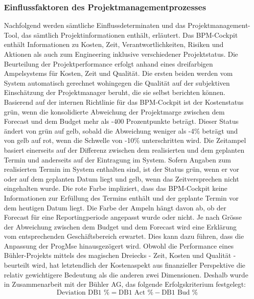 \subsubsection{Einflussfaktoren des Projektmanagementprozesses}\label{zweizwei}
Nachfolgend werden sämtliche Einflussdeterminaten und das Projektmanagement-Tool, das sämtlich Projektinformationen enthält, erläutert.
\newline
Das BPM-Cockpit enthält Informationen zu Kosten, Zeit, Verantwortlichkeiten, Risiken und Aktionen als auch zum Engineering inklusive verschiedener Projektstatus. Die Beurteilung der Projektperformance erfolgt anhand eines dreifarbigen Ampelsystems für Kosten, Zeit und Qualität. Die ersten beiden werden vom System automatisch gerechnet wohingegen die Qualität auf der subjektiven Einschätzung der Projektmanager beruht, die sie selbst berichten können. Basierend auf der internen Richtlinie für das BPM-Cockpit ist der Kostenstatus grün, wenn die konsolidierte Abweichung der Projektmarge zwischen dem Forecast und dem Budget mehr als -400 Prozentpunkte beträgt. Dieser Status ändert von grün auf gelb, sobald die Abweichung weniger als -4\% beträgt und von gelb auf rot, wenn die Schwelle von -10\% unterschritten wird. Die Zeitampel basiert einerseits auf der Differenz zwischen dem realisierten und dem geplanten Termin und anderseits auf der Eintragung im System. Sofern Angaben zum realisierten Termin im System enthalten sind, ist der Status grün, wenn er vor oder auf dem geplanten Datum liegt und gelb, wenn das Zeitversprechen nicht eingehalten wurde. Die rote Farbe impliziert, dass das BPM-Cockpit keine Informationen zur Erfüllung des Termins enthält und der geplante Termin vor dem heutigen Datum liegt. Die Farbe der Ampeln hängt davon ab, ob der Forecast für eine Reportingperiode angepasst wurde oder nicht. Je nach Grösse der Abweichung zwischen dem Budget und dem Forecast wird eine Erklärung vom entsprechenden Geschäftsbereich erwartet. Dies kann dazu führen, dass die Anpassung der ProgMse hinausgezögert wird.
\newline
Obwohl die Performance eines Bühler-Projekts mittels des magischen Dreiecks - Zeit, Kosten und Qualität - beurteilt wird, hat letztendlich der Kostenaspekt aus finanzieller Perspektive die relativ gewichtigere Bedeutung als die anderen zwei Dimensionen. Deshalb wurde in Zusammenarbeit mit der Bühler AG, das folgende Erfolgskriterium festgelegt:
\begin{equation}
	\text{Deviation DB1 \%} = \text{DB1 Act \%} - \text{DB1 Bud \%}
\end{equation}
